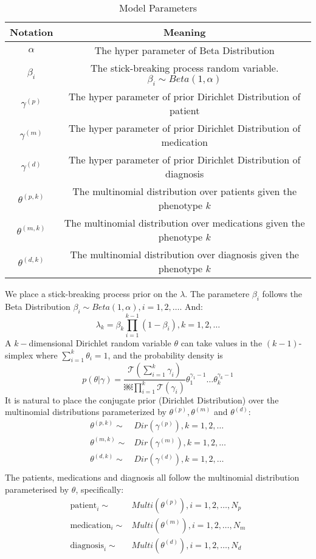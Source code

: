 \documentclass[conference]{IEEEtran}
\newcommand\Tau{\mathcal{T}}
\begin{document}
\begin{table}[h]
\caption{Model Parameters}
\label{model_param}
\centering
\begin{tabular}{|c||c|}
\hline
Notation & Meaning\\
\hline
$\alpha$ & The hyper parameter of Beta Distribution \\
\hline
$\beta_i$ & The stick-breaking process random variable. $\beta_i \sim Beta(1, \alpha)$ \\
\hline
$\gamma^{(p)}$ & The hyper parameter of prior Dirichlet Distribution of patient \\
\hline
$\gamma^{(m)}$ & The hyper parameter of prior Dirichlet Distribution of medication \\
\hline
$\gamma^{(d)}$ & The hyper parameter of prior Dirichlet Distribution of diagnosis \\
\hline
$\theta^{(p, k)}$ & The multinomial distribution over patients given the phenotype $k$ \\
\hline
$\theta^{(m, k)}$ & The multinomial distribution over medications given the phenotype $k$ \\
\hline
$\theta^{(d, k)}$ & The multinomial distribution over diagnosis given the phenotype $k$ \\
\hline
\end{tabular}
\end{table}

We place a stick-breaking process prior on the \textbf{$\lambda$}. The parametere $\beta_i$ follows the Beta Distribution $\beta_i \sim Beta(1, \alpha), i = 1, 2, \ldots$. And:
\[
	\lambda_k = \beta_k \prod_{i=1}^{k-1} (1 - \beta_i), k = 1, 2, \ldots
\]
A $k-$dimensional Dirichlet random variable $\theta$ can take values in the $(k-1)$-simplex where $\sum_{i=1}^k \theta_i = 1$, and the probability density is 
\[
	p(\theta | \gamma) = \frac{\Tau (\sum_{i=1}^k \gamma_i)}{￼\prod_{i=1}^k \Tau(\gamma_i)} \theta_1^{\gamma_1 - 1}\ldots \theta_k^{\gamma_k - 1}
\]
It is natural to place the conjugate prior (Dirichlet Distribution) over the multinomial distributions parameterized by $\theta^{(p)}, \theta^{(m)}$ and $\theta^{(d)}$:
\begin{align*}
	\theta^{(p, k)} \sim & Dir(\gamma^{(p)}), k = 1, 2, \ldots \\
	\theta^{(m, k)} \sim & Dir(\gamma^{(m)}), k = 1, 2, \ldots \\
	\theta^{(d, k)} \sim & Dir(\gamma^{(d)}), k = 1, 2, \ldots \\
\end{align*}
The patients, medications and diagnosis all follow the multinomial distribution parameterised by $\theta$, specifically:
\begin{align*}
	\text{patient}_i \sim & Multi(\theta^{(p)}), i = 1, 2, \ldots, N_p \\
	\text{medication}_i \sim & Multi(\theta^{(m)}), i = 1, 2, \ldots, N_m \\
	\text{diagnosis}_i \sim & Multi(\theta^{(d)}), i = 1, 2, \ldots, N_d \\
\end{align*}
\end{document}
